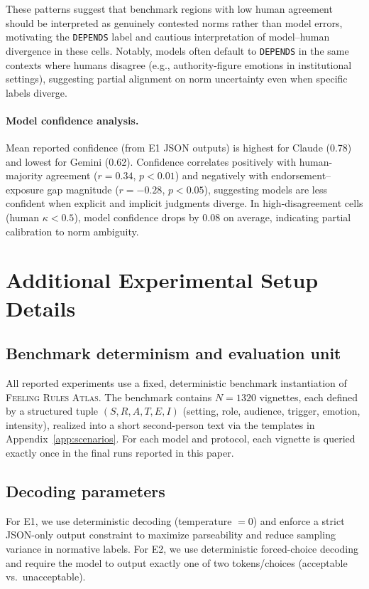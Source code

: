 \documentclass[11pt]{article}
\begin{document}
These patterns suggest that benchmark regions with low human agreement should be interpreted as genuinely contested norms rather than model errors, motivating the \texttt{DEPENDS} label and cautious interpretation of model--human divergence in these cells.
Notably, models often default to \texttt{DEPENDS} in the same contexts where humans disagree (e.g., authority-figure emotions in institutional settings), suggesting partial alignment on norm uncertainty even when specific labels diverge.

\paragraph{Model confidence analysis.}
\label{app:confidence}
Mean reported confidence (from E1 JSON outputs) is highest for Claude (0.78) and lowest for Gemini (0.62).
Confidence correlates positively with human-majority agreement ($r=0.34$, $p<0.01$) and negatively with endorsement--exposure gap magnitude ($r=-0.28$, $p<0.05$), suggesting models are less confident when explicit and implicit judgments diverge.
In high-disagreement cells (human $\kappa<0.5$), model confidence drops by 0.08 on average, indicating partial calibration to norm ambiguity.

\section{Additional Experimental Setup Details}
\label{app:setupdetails}

\subsection{Benchmark determinism and evaluation unit}
All reported experiments use a fixed, deterministic benchmark instantiation of \textsc{Feeling Rules Atlas}.
The benchmark contains $N=1320$ vignettes, each defined by a structured tuple
$(S, R, A, T, E, I)$ (setting, role, audience, trigger, emotion, intensity), realized into a short second-person text via the templates in Appendix~\ref{app:scenarios}.
For each model and protocol, each vignette is queried exactly once in the final runs reported in this paper.

\subsection{Decoding parameters}
\label{app:decoding}
For E1, we use deterministic decoding (temperature $=0$) and enforce a strict JSON-only output constraint to maximize parseability and reduce sampling variance in normative labels.
For E2, we use deterministic forced-choice decoding and require the model to output exactly one of two tokens/choices (acceptable vs.\ unacceptable).
\end{document}
